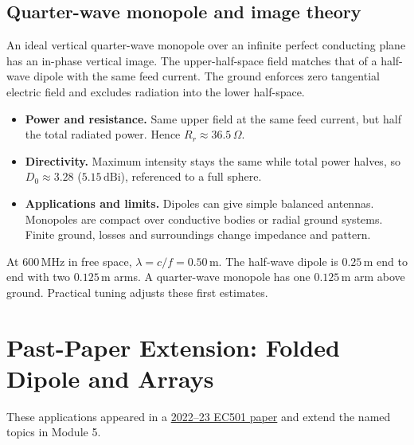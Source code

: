 \documentclass[12pt,a4paper]{article}
\begin{document}
\subsection{Quarter-wave monopole and image theory}
An ideal vertical quarter-wave monopole over an infinite perfect conducting plane has an in-phase vertical image. The upper-half-space field matches that of a half-wave dipole with the same feed current. The ground enforces zero tangential electric field and excludes radiation into the lower half-space.
\begin{tcolorbox}[tikzbox,title={Quarter-wave monopole and its image},unbreakable]
\centering
{}
\end{tcolorbox}
\begin{itemize}[leftmargin=*,itemsep=3pt]
\item \textbf{Power and resistance.} Same upper field at the same feed current, but half the total radiated power. Hence $R_r\approx36.5\,\Omega$.
\item \textbf{Directivity.} Maximum intensity stays the same while total power halves, so $D_0\approx3.28$ ($5.15\,\mathrm{dBi}$), referenced to a full sphere.
\item \textbf{Applications and limits.} Dipoles can give simple balanced antennas. Monopoles are compact over conductive bodies or radial ground systems. Finite ground, losses and surroundings change impedance and pattern.
\end{itemize}
At $600\,\mathrm{MHz}$ in free space, $\lambda=c/f=0.50\,\mathrm m$. The half-wave dipole is $0.25\,\mathrm m$ end to end with two $0.125\,\mathrm m$ arms. A quarter-wave monopole has one $0.125\,\mathrm m$ arm above ground. Practical tuning adjusts these first estimates.

\section{Past-Paper Extension: Folded Dipole and Arrays}
These applications appeared in a \href{https://www.scribd.com/document/972492704/Electromagnetic-Waves-EC501-5587-I040}{2022--23 EC501 paper} and extend the named topics in Module 5.
\end{document}
